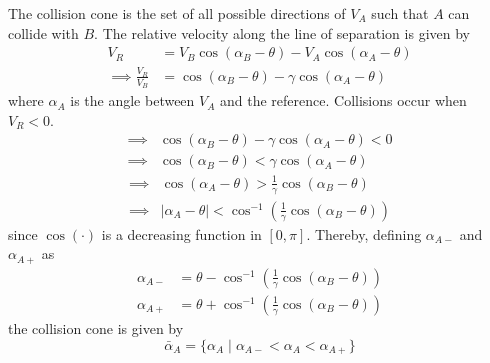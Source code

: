 The collision cone is the set of all possible directions of \( V_A \) such that \( A \) can collide with \( B \).
The relative velocity along the line of separation is given by
\begin{align*}
      V_{R}
       & =
      V_B \cos (\alpha_B - \theta) - V_A \cos (\alpha_A - \theta)
      \\
      \implies
      \frac{V_R}{V_B}
       & =
      \cos (\alpha_B - \theta) - \gamma \cos (\alpha_A - \theta)
\end{align*}
where \( \alpha_A \) is the angle between \( V_A \) and the reference.
Collisions occur when \( V_R < 0 \).
\begin{align*}
      \implies &
      \cos (\alpha_B - \theta) - \gamma \cos (\alpha_A - \theta) < 0
      \\ \implies &
      \cos (\alpha_B - \theta) < \gamma \cos (\alpha_A - \theta)
\end{align*}
\begin{align*}
      \implies &
      \cos (\alpha_A - \theta) > \frac{1}{\gamma} \cos (\alpha_B - \theta)
      \\ \implies &
      \vert \alpha_A - \theta \vert < \cos^{-1} \left( \frac{1}{\gamma} \cos (\alpha_B - \theta) \right)
\end{align*}
since \( \cos(\cdot) \) is a decreasing function in \( [0, \pi] \). Thereby, defining \( \alpha_{A -} \) and \( \alpha_{A +} \) as
\begin{equation*}
      \boxed{
            \begin{aligned}
                  \alpha_{A -}
                   & =
                  \theta - \cos^{-1} \left( \frac{1}{\gamma} \cos (\alpha_B - \theta) \right)
                  \\
                  \alpha_{A +}
                   & =
                  \theta + \cos^{-1} \left( \frac{1}{\gamma} \cos (\alpha_B - \theta) \right)
            \end{aligned}
      }
\end{equation*}
the collision cone is given by
\begin{equation*}
      \boxed{
            \bar \alpha_A = \{ \alpha_A \mid \alpha_{A -} < \alpha_A < \alpha_{A +} \}
      }
\end{equation*}
